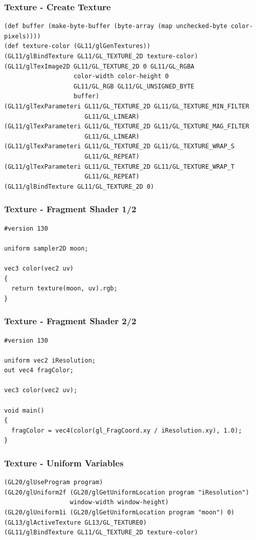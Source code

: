 \documentclass[aspectratio=169,11pt,xcolor=dvipsnames]{beamer}
\begin{document}
\begin{frame}[fragile]
  \frametitle{Texture {-} Create Texture}
  \begin{verbatim}
(def buffer (make-byte-buffer (byte-array (map unchecked-byte color-pixels))))
(def texture-color (GL11/glGenTextures))
(GL11/glBindTexture GL11/GL_TEXTURE_2D texture-color)
(GL11/glTexImage2D GL11/GL_TEXTURE_2D 0 GL11/GL_RGBA
                   color-width color-height 0
                   GL11/GL_RGB GL11/GL_UNSIGNED_BYTE
                   buffer)
(GL11/glTexParameteri GL11/GL_TEXTURE_2D GL11/GL_TEXTURE_MIN_FILTER
                      GL11/GL_LINEAR)
(GL11/glTexParameteri GL11/GL_TEXTURE_2D GL11/GL_TEXTURE_MAG_FILTER
                      GL11/GL_LINEAR)
(GL11/glTexParameteri GL11/GL_TEXTURE_2D GL11/GL_TEXTURE_WRAP_S
                      GL11/GL_REPEAT)
(GL11/glTexParameteri GL11/GL_TEXTURE_2D GL11/GL_TEXTURE_WRAP_T
                      GL11/GL_REPEAT)
(GL11/glBindTexture GL11/GL_TEXTURE_2D 0)
  \end{verbatim}
\end{frame}

\begin{frame}[fragile]
  \frametitle{Texture {-} Fragment Shader 1/2}
  \begin{verbatim}
#version 130

uniform sampler2D moon;

vec3 color(vec2 uv)
{
  return texture(moon, uv).rgb;
}
  \end{verbatim}
\end{frame}

\begin{frame}[fragile]
  \frametitle{Texture {-} Fragment Shader 2/2}
  \begin{verbatim}
#version 130

uniform vec2 iResolution;
out vec4 fragColor;

vec3 color(vec2 uv);

void main()
{
  fragColor = vec4(color(gl_FragCoord.xy / iResolution.xy), 1.0);
}
  \end{verbatim}
\end{frame}

\begin{frame}[fragile]
  \frametitle{Texture {-} Uniform Variables}
  \begin{verbatim}
(GL20/glUseProgram program)
(GL20/glUniform2f (GL20/glGetUniformLocation program "iResolution")
                  window-width window-height)
(GL20/glUniform1i (GL20/glGetUniformLocation program "moon") 0)
(GL13/glActiveTexture GL13/GL_TEXTURE0)
(GL11/glBindTexture GL11/GL_TEXTURE_2D texture-color)
  \end{verbatim}
\end{frame}
\end{document}
